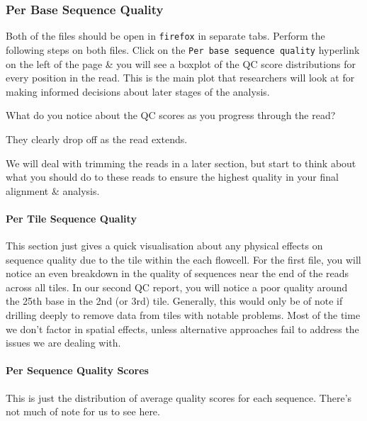 \subsubsection*{Per Base Sequence Quality}
\begin{steps}
Both of the files should be open in \texttt{firefox} in separate tabs.
Perform the following steps on both files.
Click on the \texttt{Per base sequence quality} hyperlink on the left of the page \& you will see a boxplot of the QC score distributions for every position in the read.
This is the main plot that researchers will look at for making informed decisions about later stages of the analysis.
\end{steps}

\begin{questions}
What do you notice about the QC scores as you progress through the read? \\
\begin{answer}
They clearly drop off as the read extends.\\
\end{answer}
\end{questions}

We will deal with trimming the reads in a later section, but start to think about what you should do to these reads to ensure the highest quality in your final alignment \& analysis.

\paragraph{Per Tile Sequence Quality}
This section just gives a quick visualisation about any physical effects on sequence quality due to the tile within the each flowcell.
For the first file, you will notice an even breakdown in the quality of sequences near the end of the reads across all tiles.
In our second QC report, you will notice a poor quality around the 25th base in the 2nd (or 3rd) tile.
Generally, this would only be of note if drilling deeply to remove data from tiles with notable problems.
Most of the time we don't factor in spatial effects, unless alternative approaches fail to address the issues we are dealing with.

\paragraph*{Per Sequence Quality Scores}
This is just the distribution of average quality scores for each sequence.
There's not much of note for us to see here.

